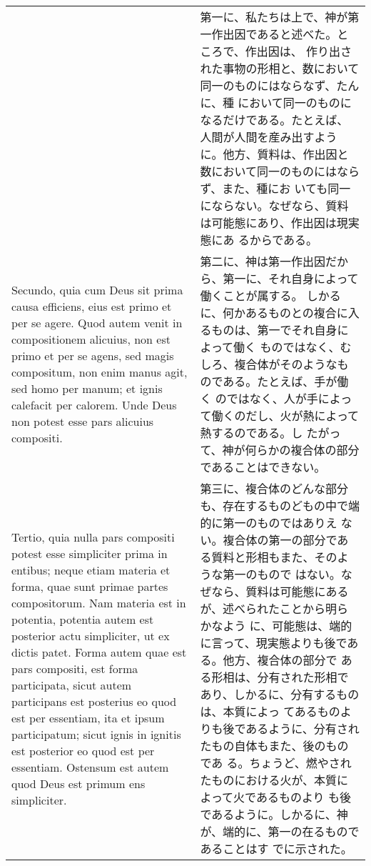 \documentclass[10pt]{jsarticle} %
\begin{document}
\begin{longtable}{p{21em}p{21em}}
&

第一に、私たちは上で、神が第一作出因であると述べた。ところで、作出因は、
 作り出された事物の形相と、数において同一のものにはならなず、たんに、種
 において同一のものになるだけである。たとえば、人間が人間を産み出すよう
 に。他方、質料は、作出因と数において同一のものにはならず、また、種にお
 いても同一にならない。なぜなら、質料は可能態にあり、作出因は現実態にあ
 るからである。

\\


Secundo, quia cum Deus sit prima causa efficiens, eius est primo et per
 se agere. Quod autem venit in compositionem alicuius, non est primo et
 per se agens, sed magis compositum, non enim manus agit, sed homo per
 manum; et ignis calefacit per calorem. Unde Deus non potest esse pars
 alicuius compositi.

&

第二に、神は第一作出因だから、第一に、それ自身によって働くことが属する。
 しかるに、何かあるものとの複合に入るものは、第一でそれ自身によって働く
 ものではなく、むしろ、複合体がそのようなものである。たとえば、手が働く
 のではなく、人が手によって働くのだし、火が熱によって熱するのである。し
 たがって、神が何らかの複合体の部分であることはできない。

\\

Tertio, quia nulla pars compositi potest esse simpliciter prima in
 entibus; neque etiam materia et forma, quae sunt primae partes
 compositorum. Nam materia est in potentia, potentia autem est posterior
 actu simpliciter, ut ex dictis patet. Forma autem quae est pars
 compositi, est forma participata, sicut autem participans est posterius
 eo quod est per essentiam, ita et ipsum participatum; sicut ignis in
 ignitis est posterior eo quod est per essentiam. Ostensum est autem
 quod Deus est primum ens simpliciter.

&

第三に、複合体のどんな部分も、存在するものどもの中で端的に第一のものではありえ
 ない。複合体の第一の部分である質料と形相もまた、そのような第一のもので
 はない。なぜなら、質料は可能態にあるが、述べられたことから明らかなよう
 に、可能態は、端的に言って、現実態よりも後である。他方、複合体の部分で
 ある形相は、分有された形相であり、しかるに、分有するものは、本質によっ
 てあるものよりも後であるように、分有されたもの自体もまた、後のものであ
 る。ちょうど、燃やされたものにおける火が、本質によって火であるものより
 も後であるように。しかるに、神が、端的に、第一の在るものであることはす
 でに示された。


\end{longtable}
\end{document}
